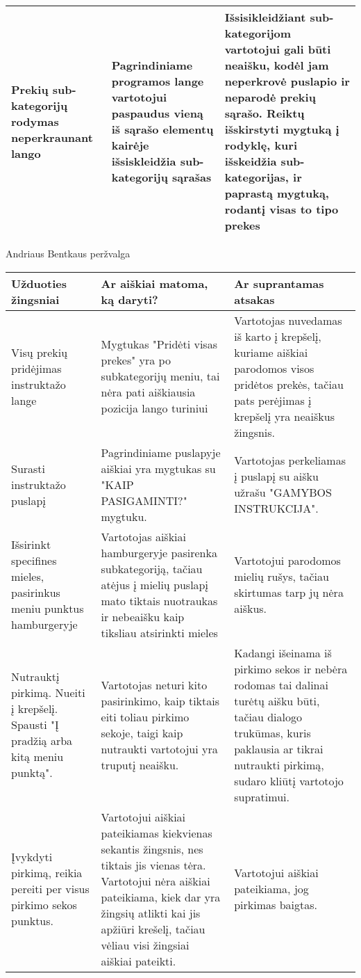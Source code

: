 \documentclass[oneside]{VUMIFPSkursinis}
\begin{document}
\begin{center}
\begin{tabular}{ |p{4cm}| p{6cm} | p{7cm} | }
	Prekių sub-kategorijų rodymas neperkraunant lango & Pagrindiniame programos lange vartotojui paspaudus vieną iš sąrašo elementų kairėje išsiskleidžia sub-kategorijų sąrašas & Išsisikleidžiant sub-kategorijom vartotojui gali būti neaišku, kodėl jam neperkrovė puslapio ir neparodė prekių sąrašo. Reiktų išskirstyti mygtuką į rodyklę, kuri išskeidžia sub-kategorijas, ir paprastą mygtuką, rodantį visas to tipo prekes \\ \hline

   \hline
    \end{tabular}
\end{center}

\pagebreak
Andriaus Bentkaus peržvalga
\begin{center}
	\begin{tabular}{ |p{3cm}| p{6cm} | p{8cm} | }
		\hline
		Užduoties žingsniai & Ar aiškiai matoma, ką daryti? & Ar suprantamas atsakas \\ \hline

		Visų prekių pridėjimas instruktažo lange &
		Mygtukas "Pridėti visas prekes" yra po subkategorijų meniu, tai nėra pati aiškiausia pozicija lango turiniui &
		Vartotojas nuvedamas iš karto į krepšelį, kuriame aiškiai parodomos visos pridėtos prekės, tačiau pats perėjimas į krepšelį yra neaiškus žingsnis.
		\\ \hline

		Surasti instruktažo puslapį &
		Pagrindiniame puslapyje aiškiai yra mygtukas su "KAIP PASIGAMINTI?" mygtuku. &
		Vartotojas perkeliamas į puslapį su aišku užrašu "GAMYBOS INSTRUKCIJA".
		\\ \hline

		Išsirinkt specifines mieles, pasirinkus meniu punktus hamburgeryje &
		Vartotojas aiškiai hamburgeryje pasirenka subkategoriją, tačiau atėjus į mielių puslapį mato tiktais nuotraukas ir nebeaišku kaip tiksliau atsirinkti mieles &
		Vartotojui parodomos mielių rušys, tačiau skirtumas tarp jų nėra aiškus.
		\\ \hline

		Nutrauktį pirkimą.
		Nueiti į krepšelį.
		Spausti "Į pradžią arba kitą meniu punktą". &
		Vartotojas neturi kito pasirinkimo, kaip tiktais eiti toliau pirkimo sekoje, taigi kaip nutraukti vartotojui yra truputį neaišku. &
		Kadangi išeinama iš pirkimo sekos ir nebėra rodomas tai dalinai turėtų aišku būti, tačiau dialogo trukūmas, kuris paklausia ar tikrai nutraukti pirkimą, sudaro kliūtį vartotojo supratimui.
		\\ \hline

		Įvykdyti pirkimą, reikia pereiti per visus pirkimo sekos punktus. &
		Vartotojui aiškiai pateikiamas kiekvienas sekantis žingsnis, nes tiktais jis vienas tėra. Vartotojui nėra aiškiai pateikiama, kiek dar yra žingsių atlikti kai jis apžiūri krešelį, tačiau vėliau visi žingsiai aiškiai pateikti. &
		Vartotojui aiškiai pateikiama, jog pirkimas baigtas.
		\\ \hline
	\end{tabular}
\end{center}
\end{document}
